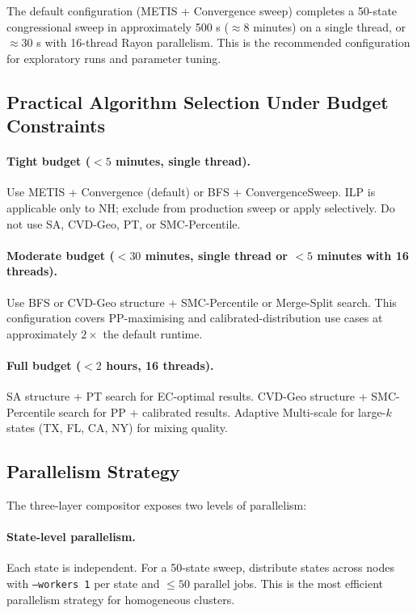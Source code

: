 The default configuration (METIS + Convergence sweep) completes a 50-state
congressional sweep in approximately 500 s ($\approx 8$ minutes) on a
single thread, or $\approx 30$ s with 16-thread Rayon parallelism.
This is the recommended configuration for exploratory runs and parameter tuning.

\subsection{Practical Algorithm Selection Under Budget Constraints}

\paragraph{Tight budget ($< 5$ minutes, single thread).}
Use METIS + Convergence (default) or BFS + ConvergenceSweep.
ILP is applicable only to NH; exclude from production sweep or apply
selectively.
Do not use SA, CVD-Geo, PT, or SMC-Percentile.

\paragraph{Moderate budget ($< 30$ minutes, single thread or $< 5$ minutes
with 16 threads).}
Use BFS or CVD-Geo structure + SMC-Percentile or Merge-Split search.
This configuration covers PP-maximising and calibrated-distribution use
cases at approximately $2\times$ the default runtime.

\paragraph{Full budget ($< 2$ hours, 16 threads).}
SA structure + PT search for EC-optimal results.
CVD-Geo structure + SMC-Percentile search for PP + calibrated results.
Adaptive Multi-scale for large-$k$ states (TX, FL, CA, NY) for mixing
quality.

\subsection{Parallelism Strategy}

The three-layer compositor exposes two levels of parallelism:

\paragraph{State-level parallelism.}
Each state is independent.
For a 50-state sweep, distribute states across nodes with
\texttt{--workers 1} per state and $\leq 50$ parallel jobs.
This is the most efficient parallelism strategy for homogeneous clusters.

